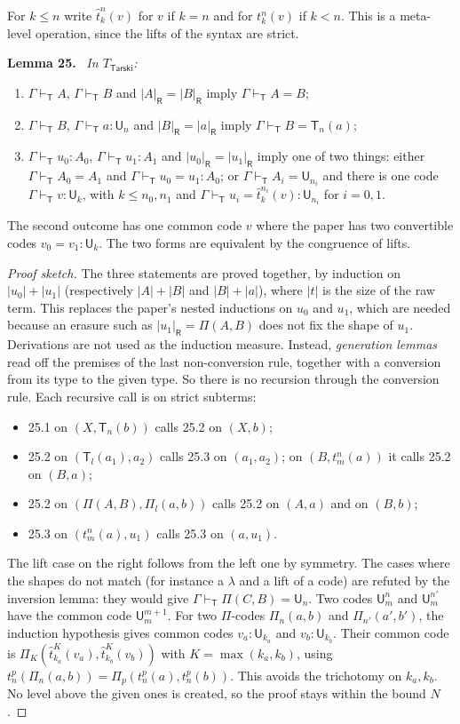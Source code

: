 \documentclass[11pt]{article}
\newenvironment{lemma}[1]{\par\medskip\noindent\textbf{Lemma #1.}\ \itshape}{\par\medskip}
\theoremstyle{definition}
\theoremstyle{remark}
\newcommand{\vdashT}{\vdash_{\mathsf T}}
\newcommand{\U}{\mathsf U}
\newcommand{\T}{\mathsf T}
\newcommand{\erR}[1]{|#1|_{\mathsf R}}
\begin{document}
For $k\le n$ write $\hat t^n_k(v)$ for $v$ if $k=n$ and for $t^n_k(v)$ if
$k<n$. This is a meta-level operation, since the lifts of the syntax are
strict.

\begin{lemma}{25}
In $T_{\mathsf{Tarski}}$:
\begin{enumerate}
\item $\Gamma\vdashT A$, $\Gamma\vdashT B$ and $\erR A=\erR B$ imply $\Gamma\vdashT A=B$;
\item $\Gamma\vdashT B$, $\Gamma\vdashT a:\U_n$ and $\erR B=\erR a$ imply $\Gamma\vdashT B=\T_n(a)$;
\item $\Gamma\vdashT u_0:A_0$, $\Gamma\vdashT u_1:A_1$ and $\erR{u_0}=\erR{u_1}$
imply one of two things:
either $\Gamma\vdashT A_0=A_1$ and $\Gamma\vdashT u_0=u_1:A_0$;
or $\Gamma\vdashT A_i=\U_{n_i}$ and there is one code $\Gamma\vdashT v:\U_k$,
with $k\le n_0,n_1$ and $\Gamma\vdashT u_i=\hat t^{n_i}_k(v):\U_{n_i}$ for $i=0,1$.
\end{enumerate}
\end{lemma}
The second outcome has one common code $v$ where the paper has two
convertible codes $v_0=v_1:\U_k$. The two forms are equivalent by the
congruence of lifts.

\begin{proof}[Proof sketch]
The three statements are proved together, by induction on
$|u_0|+|u_1|$ (respectively $|A|+|B|$ and $|B|+|a|$), where $|t|$ is the size
of the raw term. This replaces the paper's nested inductions on $u_0$ and
$u_1$, which are needed because an erasure such as $\erR{u_1}=\Pi(A,B)$
does not fix the shape of $u_1$. Derivations are not used as the induction
measure. Instead, \emph{generation lemmas} read off the premises of the
last non-conversion rule, together with a conversion from its type to the
given type. So there is no recursion through the conversion rule.
Each recursive call is on strict subterms:
\begin{itemize}
\item 25.1 on $(X,\T_n(b))$ calls 25.2 on $(X,b)$;
\item 25.2 on $(\T_l(a_1),a_2)$ calls 25.3 on $(a_1,a_2)$; on $(B,t^n_m(a))$ it calls 25.2 on $(B,a)$;
\item 25.2 on $(\Pi(A,B),\Pi_l(a,b))$ calls 25.2 on $(A,a)$ and on $(B,b)$;
\item 25.3 on $(t^n_m(a),u_1)$ calls 25.3 on $(a,u_1)$.
\end{itemize}
The lift case on the right follows from the left one by symmetry. The cases
where the shapes do not match (for instance a $\lambda$ and a lift of a
code) are refuted by the inversion lemma: they would give
$\Gamma\vdashT\Pi(C,B)=\U_n$. Two codes $\U^n_m$ and $\U^{n'}_m$ have the
common code $\U^{m+1}_m$. For two $\Pi$-codes
$\Pi_n(a,b)$ and $\Pi_{n'}(a',b')$, the induction hypothesis gives common
codes $v_a:\U_{k_a}$ and $v_b:\U_{k_b}$. Their common code is
$\Pi_K(\hat t^K_{k_a}(v_a),\hat t^K_{k_b}(v_b))$ with $K=\max(k_a,k_b)$,
using $t^p_n(\Pi_n(a,b))=\Pi_p(t^p_n(a),t^p_n(b))$. This avoids the
trichotomy on $k_a,k_b$. No level above the given ones is created, so the
proof stays within the bound $N$.
\end{proof}
\end{document}
